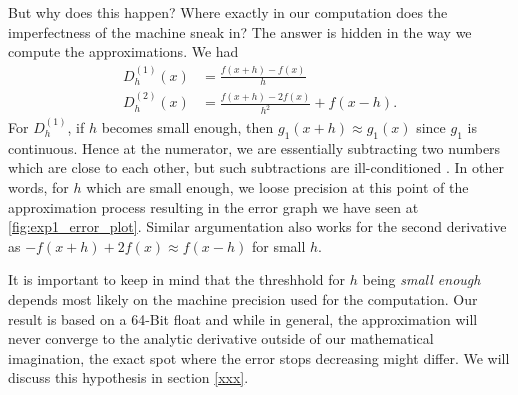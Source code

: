 But why does this happen? Where exactly in our computation does the imperfectness of the machine sneak in? The answer is hidden in the way we compute the approximations. We had
\begin{align*}
    D^{(1)}_h(x) &= \frac{f(x + h) - f(x)}{h} \\
    D^{(2)}_h(x) &= \frac{f(x + h) - 2 f(x)}{h^2} + f(x - h) \text{.}
\end{align*}
For \(D^{(1)}_h\), if \(h\) becomes small enough, then \(g_1(x + h) \approx g_1(x)\) since \(g_1\) is continuous. Hence at the numerator, we are essentially subtracting two numbers which are close to each other, but such subtractions are ill-conditioned \cite{Lecture}. In other words, for \(h\) which are small enough, we loose precision at this point of the approximation process resulting in the error graph we have seen at \ref{fig:exp1_error_plot}. Similar argumentation also works for the second derivative as \(- f(x + h) + 2 f(x) \approx f(x - h)\) for small \(h\).

It is important to keep in mind that the threshhold for \(h\) being \textit{small enough} depends most likely on the machine precision used for the computation. Our result is based on a 64-Bit float and while in general, the approximation will never converge to the analytic derivative outside of our mathematical imagination, the exact spot where the error stops decreasing might differ. We will discuss this hypothesis in section \ref{xxx}.